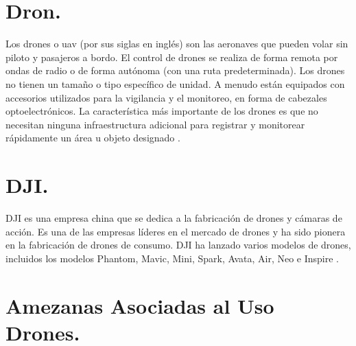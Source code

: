 \section*{\fontsize{12}{18}\selectfont Dron.}

\begin{justify}
    Los drones o \gls{uav} (por sus siglas en inglés)
    son las aeronaves que pueden volar sin piloto y pasajeros a bordo. El control de drones se realiza de forma remota
    por ondas de radio o de forma autónoma (con una ruta predeterminada). Los drones no tienen un tamaño o tipo específico de unidad.
    A menudo están equipados con accesorios utilizados para la vigilancia y el monitoreo, en forma de cabezales optoelectrónicos.
    La característica más importante de los drones es que no necesitan ninguna infraestructura adicional para registrar y monitorear rápidamente
    un área u objeto designado \parencite{kardasz2016drones}.
\end{justify}

\section*{\fontsize{12}{18}\selectfont DJI.}

\begin{justify}
    DJI es una empresa china que se dedica a la fabricación de drones y cámaras de acción. Es una de las empresas líderes en el mercado de drones
    y ha sido pionera en la fabricación de drones de consumo. DJI ha lanzado varios modelos de drones, incluidos los modelos Phantom, Mavic, Mini, Spark,
    Avata, Air, Neo e Inspire \parencite{dji}.
\end{justify}

\section*{\fontsize{12}{18}\selectfont Amezanas Asociadas al Uso Drones.}

